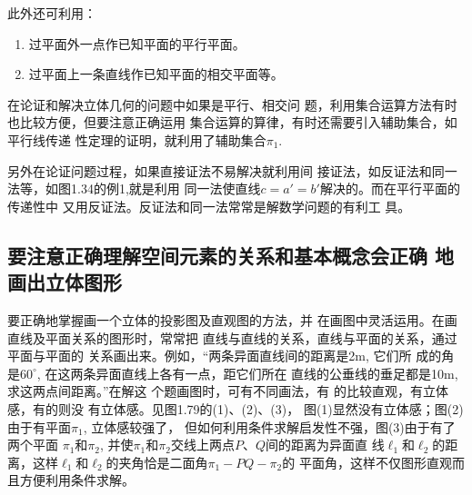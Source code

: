 此外还可利用：
\begin{enumerate}
\item 过平面外一点作已知平面的平行平面。
\item 过平面上一条直线作已知平面的相交平面等。
\end{enumerate}

在论证和解决立体几何的问题中如果是平行、相交问
题，利用集合运算方法有时也比较方便，但要注意正确运用
集合运算的算律，有时还需要引入辅助集合，如平行线传递
性定理的证明，就利用了辅助集合$\pi_1$. 

另外在论证问题过程，如果直接证法不易解决就利用间
接证法，如反证法和同一法等，如图1.34的例1,就是利用
同一法使直线$c=a'=b'$解决的。而在平行平面的传递性中
又用反证法。反证法和同一法常常是解数学问题的有利工
具。

\subsection{要注意正确理解空间元素的关系和基本概念会正确
地画出立体图形}
要正确地掌握画一个立体的投影图及直观图的方法，并
在画图中灵活运用。在画直线及平面关系的图形时，常常把
直线与直线的关系，直线与平面的关系，通过平面与平面的
关系画出来。例如，“两条异面直线间的距离是2m, 它们所
成的角是$60^{\circ}$, 在这两条异面直线上各有一点，距它们所在
直线的公垂线的垂足都是10m, 求这两点间距离。”在解这
个题画图时，可有不同画法，有
的比较直观，有立体感，有的则没
有立体感。见图1.79的(1)、(2)、(3)，
图(1)显然没有立体感；图(2)
由于有平面$\pi_1$, 立体感较强了，
但如何利用条件求解启发性不强，图(3)由于有了两个平面
$\pi_1$和$\pi_2$, 并使$\pi_1$和$\pi_2$交线上两点$P$、$Q$间的距离为异面直
线$\ell_1$和$\ell_2$的距离，这样$\ell_1$和$\ell_2$的夹角恰是二面角$\pi_1-PQ-\pi_2$的
平面角，这样不仅图形直观而且方便利用条件求解。

\begin{figure}[htp]
    \centering
    
    \caption{}
\end{figure}


